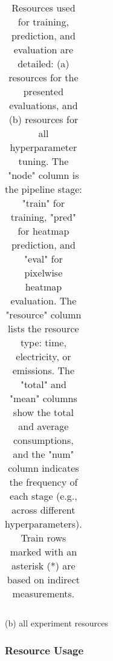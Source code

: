 \begin{table}[t]
\begin{tabular}{llllr}
\bottomrule
\end{tabular}
(b) all experiment resources
\caption[]{
Resources used for training, prediction, and evaluation are detailed:
(a) resources for the presented evaluations, and (b) resources for all hyperparameter tuning.
The "node" column is the pipeline stage:
"train" for training, "pred" for heatmap prediction, and "eval" for pixelwise heatmap evaluation.
The "resource" column lists the resource type: time, electricity, or emissions.
The "total" and "mean" columns show the total and average consumptions, and the "num" column indicates the
  frequency of each stage (e.g., across different hyperparameters).
Train rows marked with an asterisk (*) are based on indirect measurements.
}
\label{tab:resources}
\end{table}



\subsubsection{Resource Usage}

